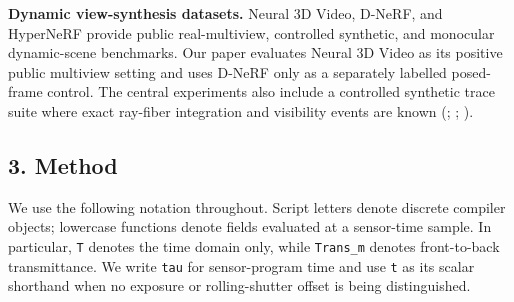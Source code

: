 \documentclass[
]{article}
\begin{document}
\textbf{Dynamic view-synthesis datasets.} Neural 3D Video, D-NeRF, and
HyperNeRF provide public real-multiview, controlled synthetic, and
monocular dynamic-scene benchmarks. Our paper evaluates Neural 3D Video
as its positive public multiview setting and uses D-NeRF only as a
separately labelled posed-frame control. The central experiments also
include a controlled synthetic trace suite where exact ray-fiber
integration and visibility events are known
(;
;
).

\subsection{3. Method}\label{method}

We use the following notation throughout. Script letters denote discrete
compiler objects; lowercase functions denote fields evaluated at a
sensor-time sample. In particular, \texttt{T} denotes the time domain
only, while \texttt{Trans\_m} denotes front-to-back transmittance. We
write \texttt{tau} for sensor-program time and use \texttt{t} as its
scalar shorthand when no exposure or rolling-shutter offset is being
distinguished.
\end{document}

